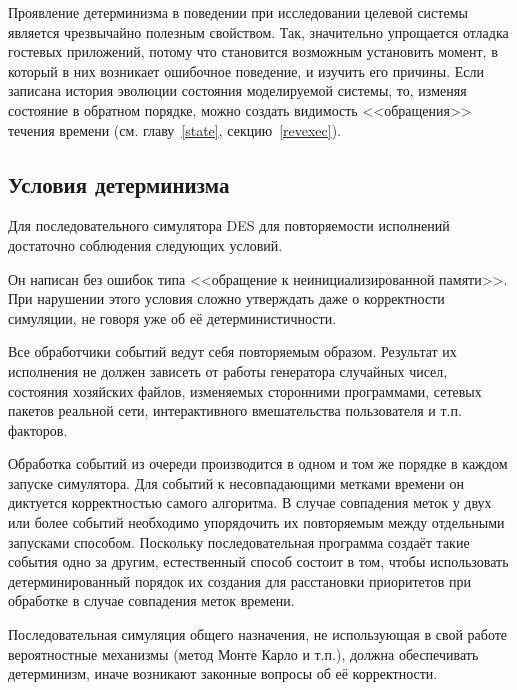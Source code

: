 Проявление детерминизма в поведении при исследовании целевой системы является чрезвычайно полезным свойством. Так, значительно упрощается отладка гостевых приложений, потому что становится возможным установить момент, в который в них возникает ошибочное поведение, и изучить его причины. Если записана история эволюции состояния моделируемой системы, то, изменяя состояние в обратном порядке, можно создать видимость <<обращения>> течения времени (см. главу~\ref{state}, секцию~\ref{revexec}).

\subsection{Условия детерминизма}

Для последовательного симулятора DES для повторяемости исполнений достаточно соблюдения следующих условий.
\begin{enumerate*}
\item Он написан без ошибок типа <<обращение к неинициализированной памяти>>. При нарушении этого условия сложно утверждать даже о корректности симуляции, не говоря уже об её детерминистичности.
\item Все обработчики событий ведут себя повторяемым образом. Результат их исполнения не должен зависеть от работы генератора случайных чисел, состояния хозяйских файлов, изменяемых сторонними программами, сетевых пакетов реальной сети, интерактивного вмешательства пользователя и т.п. факторов.
\item Обработка событий из очереди производится в одном и том же порядке в каждом запуске симулятора.  Для событий к несовпадающими метками времени он диктуется корректностью самого алгоритма. В случае совпадения меток у двух или более событий необходимо упорядочить их повторяемым между отдельными запусками способом. Поскольку последовательная программа создаёт такие события одно за другим, естественный способ состоит в том, чтобы использовать детерминированный порядок их создания для расстановки приоритетов при обработке в случае совпадения меток времени.
\end{enumerate*}

Последовательная симуляция общего назначения, не использующая в свой работе вероятностные механизмы (метод Монте Карло и т.п.), должна обеспечивать детерминизм, иначе возникают законные вопросы об её корректности.

